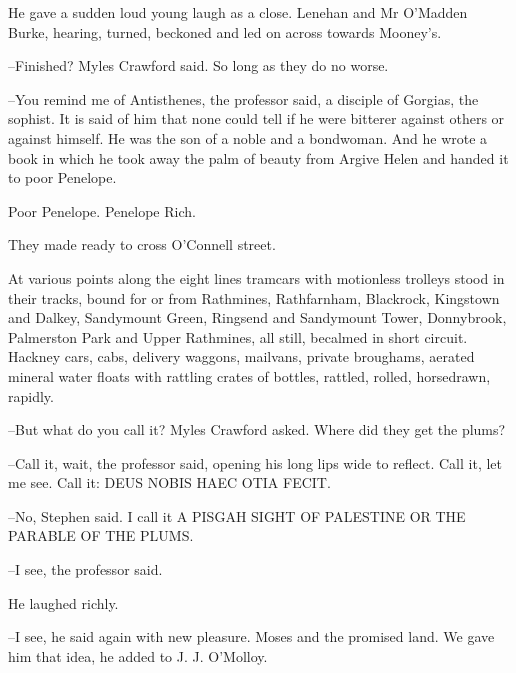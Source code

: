 He gave a sudden loud young laugh as a close. Lenehan and Mr O'Madden
Burke, hearing, turned, beckoned and led on across towards Mooney's.

--Finished? Myles Crawford said. So long as they do no worse.



--You remind me of Antisthenes, the professor said, a disciple of
Gorgias, the sophist. It is said of him that none could tell if he were
bitterer against others or against himself. He was the son of a noble and
a bondwoman. And he wrote a book in which he took away the palm of beauty
from Argive Helen and handed it to poor Penelope.

Poor Penelope. Penelope Rich.

They made ready to cross O'Connell street.



At various points along the eight lines tramcars with motionless
trolleys stood in their tracks, bound for or from Rathmines, Rathfarnham,
Blackrock, Kingstown and Dalkey, Sandymount Green, Ringsend and
Sandymount Tower, Donnybrook, Palmerston Park and Upper Rathmines,
all still, becalmed in short circuit. Hackney cars, cabs, delivery
waggons, mailvans, private broughams, aerated mineral water floats with
rattling crates of bottles, rattled, rolled, horsedrawn, rapidly.




--But what do you call it? Myles Crawford asked. Where did they get the
plums?



--Call it, wait, the professor said, opening his long lips wide to
reflect. Call it, let me see. Call it: DEUS NOBIS HAEC OTIA FECIT.

--No, Stephen said. I call it A PISGAH SIGHT OF PALESTINE OR THE PARABLE
OF THE PLUMS.

--I see, the professor said.

He laughed richly.

--I see, he said again with new pleasure. Moses and the promised land. We
gave him that idea, he added to J. J. O'Molloy.


